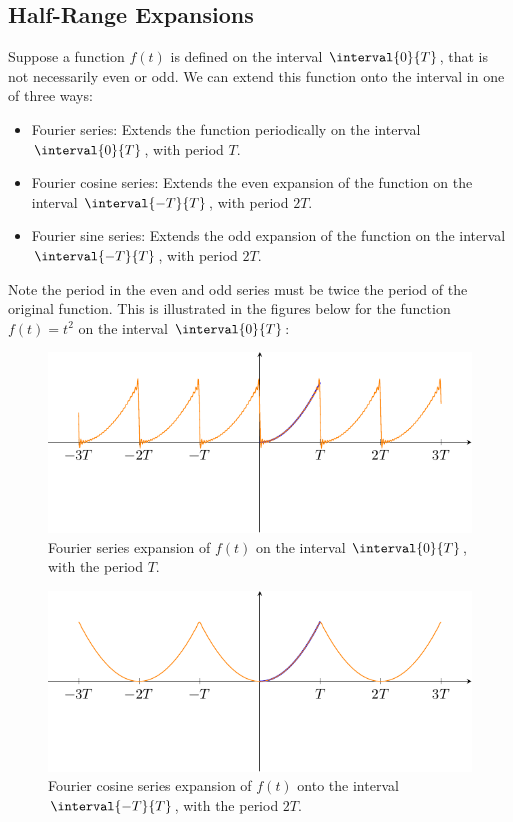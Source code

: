 \documentclass{article}
\begin{document}
\subsection{Half-Range Expansions}
Suppose a function \(f\left( t \right)\) is defined on the interval
\(\interval{0}{T}\), that is not necessarily even or odd. We can extend
this function onto the interval in one of three ways:
\begin{itemize}
    \item Fourier series: Extends the function periodically on the
          interval \(\interval{0}{T}\), with period \(T\).
    \item Fourier cosine series: Extends the even expansion of the
          function on the interval \(\interval{-T}{T}\), with period
          \(2T\).
    \item Fourier sine series: Extends the odd expansion of the
          function on the interval \(\interval{-T}{T}\), with period
          \(2T\).
\end{itemize}
Note the period in the even and odd series must be twice the period of
the original function. This is illustrated in the figures below for the
function \(f\left( t \right) = t^2\) on the interval \(\interval{0}{T}\):
\begin{figure}[H]
    \centering
    \includegraphics[width = 0.8\linewidth]{figures/half_range_expansion_Fourier.pdf}
    \caption{Fourier series expansion of \(f\left( t \right)\) on the interval \(\interval{0}{T}\), with the period \(T\).} %
\end{figure}
\begin{figure}[H]
    \centering
    \includegraphics[width = 0.8\linewidth]{figures/half_range_expansion_Cosine.pdf}
    \caption{Fourier cosine series expansion of \(f\left( t \right)\) onto the interval \(\interval{-T}{T}\), with the period \(2T\).} %
\end{figure}
\end{document}
